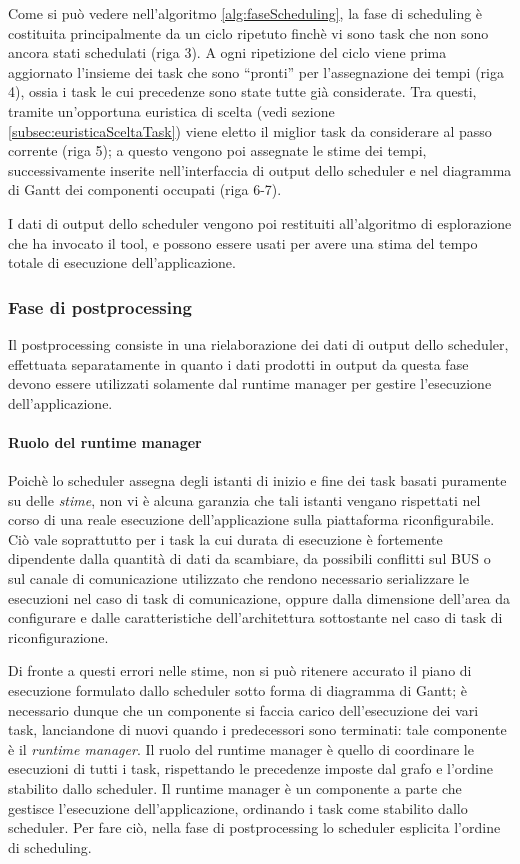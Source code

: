 Come si può vedere nell'algoritmo \ref{alg:faseScheduling}, la fase di 
scheduling è costituita principalmente da un ciclo ripetuto finchè vi sono 
task che non sono ancora stati schedulati (riga 3). A ogni ripetizione del ciclo viene 
prima aggiornato l'insieme dei task che sono ``pronti'' per l'assegnazione dei 
tempi (riga 4), ossia i task le cui precedenze sono state tutte già considerate. Tra 
questi, tramite un'opportuna euristica di scelta (vedi sezione 
\ref{subsec:euristicaSceltaTask}) viene eletto il miglior task da considerare al 
passo corrente (riga 5); a questo vengono poi assegnate le stime dei tempi, 
successivamente inserite nell'interfaccia di output dello scheduler e nel 
diagramma di Gantt dei componenti occupati (riga 6-7).

I dati di output dello scheduler vengono poi restituiti all'algoritmo di 
esplorazione che ha invocato il tool, e possono essere usati per avere una 
stima del tempo totale di esecuzione dell'applicazione.


\subsubsection{Fase di postprocessing}
Il postprocessing consiste in una rielaborazione dei dati di output dello 
scheduler, effettuata separatamente in quanto i dati prodotti in output da 
questa fase devono essere utilizzati solamente dal runtime manager per gestire 
l'esecuzione dell'applicazione.

\paragraph{Ruolo del runtime manager}
Poichè lo scheduler assegna degli istanti di inizio e fine dei task basati 
puramente su delle \emph{stime}, non vi è alcuna garanzia che tali istanti 
vengano rispettati nel corso di una reale esecuzione dell'applicazione sulla 
piattaforma riconfigurabile. Ciò vale soprattutto per i task la cui
durata di esecuzione è fortemente dipendente dalla quantità di dati da 
scambiare, da possibili conflitti sul BUS o sul canale di comunicazione 
utilizzato che rendono necessario serializzare le esecuzioni nel caso di 
task di comunicazione, oppure dalla dimensione dell'area da configurare e 
dalle caratteristiche dell'architettura sottostante nel caso di task di 
riconfigurazione.

Di fronte a questi errori nelle stime, non si può ritenere accurato il piano di 
esecuzione formulato dallo scheduler sotto forma di diagramma di Gantt; è 
necessario dunque che un componente si faccia carico dell'esecuzione dei vari 
task, lanciandone di nuovi quando i predecessori sono terminati: tale 
componente è il \emph{runtime manager}. Il ruolo del runtime manager è quello 
di coordinare le esecuzioni di tutti i task, rispettando le precedenze imposte 
dal grafo e l'ordine stabilito dallo scheduler. Il runtime manager \`e un componente
a parte che gestisce l'esecuzione dell'applicazione, ordinando i task come stabilito
dallo scheduler. Per fare ci\`o, nella fase di postprocessing lo scheduler esplicita
l'ordine di scheduling.

